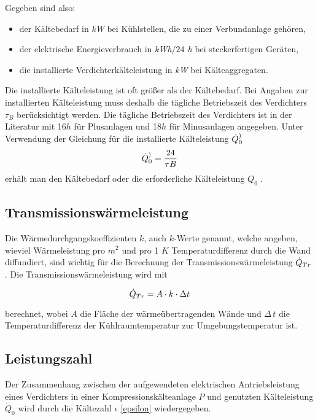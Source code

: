 Gegeben sind also:
\begin{itemize}
	\item der Kältebedarf in \textit{kW} bei Kühlstellen, die zu einer Verbundanlage gehören,
	\item der elektrische Energieverbrauch in \textit{kWh$/24$ h} bei steckerfertigen Geräten,
	\item die installierte Verdichterkälteleistung in \textit{kW} bei Kälteaggregaten.
\end{itemize}
Die installierte Kälteleistung ist oft größer als der Kältebedarf. Bei Angaben zur installierten Kälteleistung muss deshalb
die tägliche Betriebszeit des Verdichters $\tau_B$ berücksichtigt werden. Die tägliche Betriebszeit des Verdichters ist in der
Literatur mit 16$h$ für Plusanlagen und 18$h$ für Minusanlagen angegeben. Unter Verwendung der Gleichung für die installierte
Kälteleistung $\dot{Q}_0^)$
\begin{equation}
	\pinstall = \frac{24}{\tau{B}} \label{pinstall}
\end{equation}
\noindent erhält man den Kältebedarf oder die erforderliche Kälteleistung $Q_0$ .

\subsection{Transmissionswärmeleistung}

Die Wärmedurchgangskoeffizienten $k$, auch $k$-Werte genannt, welche angeben, wieviel Wärmeleistung pro $m^2$ und pro 1 $K$
Temperaturdifferenz durch die Wand diffundiert, sind wichtig für die Berechnung der Transmissionswärmeleistung $\dot{Q}_{Tr}$. Die
Transmissionswärmeleistung wird mit

\begin{equation}
	\ptrans = A \cdot k \cdot \Delta t \label{ptrans}
\end{equation}

\noindent berechnet, wobei $A$ die Fläche der wärmeübertragenden Wände und $\Delta \, t$ die Temperaturdifferenz der
Kühlraumtemperatur zur Umgebungstemperatur ist.

\subsection{Leistungszahl}
\label{Leistungszahl}
Der Zusammenhang zwischen der aufgewendeten elektrischen Antriebsleistung eines Verdichters in einer Kompressionskälteanlage
$P$ und genutzten Kälteleistung ${\dot{Q}}_0$ wird durch die Kältezahl $\epsilon$ \cref{epsilon} wiedergegeben.

